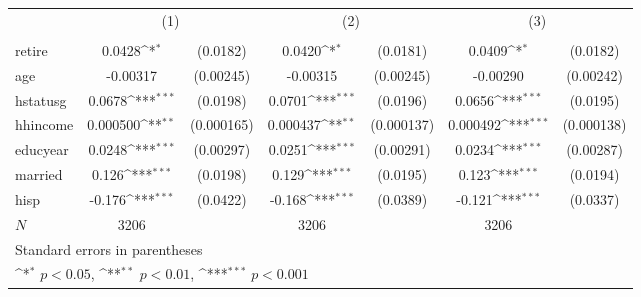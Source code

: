{
\def\sym#1{\ifmmode^{#1}\else\(^{#1}\)\fi}
\begin{tabular}{l*{3}{cc}}
\hline\hline
            &\multicolumn{2}{c}{(1)}           &\multicolumn{2}{c}{(2)}           &\multicolumn{2}{c}{(3)}           \\
            &\multicolumn{2}{c}{}              &\multicolumn{2}{c}{}              &\multicolumn{2}{c}{}              \\
\hline
retire      &      0.0428\sym{*}  &    (0.0182)&      0.0420\sym{*}  &    (0.0181)&      0.0409\sym{*}  &    (0.0182)\\
age         &    -0.00317         &   (0.00245)&    -0.00315         &   (0.00245)&    -0.00290         &   (0.00242)\\
hstatusg    &      0.0678\sym{***}&    (0.0198)&      0.0701\sym{***}&    (0.0196)&      0.0656\sym{***}&    (0.0195)\\
hhincome    &    0.000500\sym{**} &  (0.000165)&    0.000437\sym{**} &  (0.000137)&    0.000492\sym{***}&  (0.000138)\\
educyear    &      0.0248\sym{***}&   (0.00297)&      0.0251\sym{***}&   (0.00291)&      0.0234\sym{***}&   (0.00287)\\
married     &       0.126\sym{***}&    (0.0198)&       0.129\sym{***}&    (0.0195)&       0.123\sym{***}&    (0.0194)\\
hisp        &      -0.176\sym{***}&    (0.0422)&      -0.168\sym{***}&    (0.0389)&      -0.121\sym{***}&    (0.0337)\\
\hline
\(N\)       &        3206         &            &        3206         &            &        3206         &            \\
\hline\hline
\multicolumn{7}{l}{\footnotesize Standard errors in parentheses}\\
\multicolumn{7}{l}{\footnotesize \sym{*} \(p<0.05\), \sym{**} \(p<0.01\), \sym{***} \(p<0.001\)}\\
\end{tabular}
}
